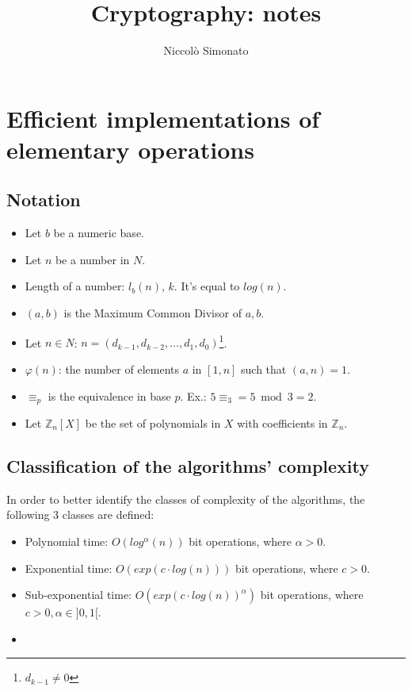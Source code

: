 \documentclass[12pt, a4paper, english]{report}
\author{Niccolò Simonato}
\title{Cryptography: notes}
\begin{document}
\maketitle

\tableofcontents

\chapter{Efficient implementations of elementary operations}
\section{Notation}
\begin{itemize}

    \item Let $b$ be a numeric base.
    \item Let $n$ be a number in $N$.
    \item Length of a number: $l_{b}(n)$, $k$. It's equal to $log(n)$.
    \item $(a,b)$ is the Maximum Common Divisor of $a,b$.
    \item Let $n \in N$: $n = (d_{k-1}, d_{k-2}, \dots, d_{1}, d_{0})$\footnote{$d_{k-1} \neq 0$}.
    \item $\varphi(n)$: the number of elements $a$ in $[1,n]$ such that $(a,n) = 1$.
    \item $\equiv_{p}$ is the equivalence in base $p$. Ex.: $5 \equiv_{3} = 5 \bmod 3 = 2 $.
    \item Let $\mathbb{Z}_{n}[X]$ be the set of polynomials in $X$ with coefficients in $\mathbb{Z}_{n}$.
\end{itemize}


\section{Classification of the algorithms' complexity}
In order to better identify the classes of complexity of the algorithms, the following 3 classes are defined:
\begin{itemize}
    \item Polynomial time: $O(log^{\alpha}(n))$ bit operations, where $\alpha > 0$.
    \item Exponential time: $O(exp(c \cdot log(n)))$ bit operations, where $c > 0$.
    \item Sub-exponential time: $O(exp(c \cdot log(n))^{\alpha})$ bit operations, where $c > 0, \alpha \in ]0, 1[$.
\item
\end{itemize}
\end{document}
